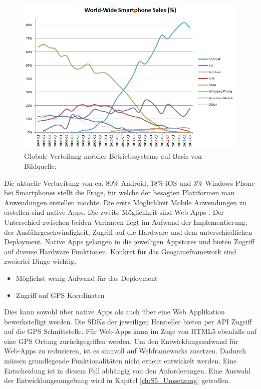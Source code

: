 \begin{figure}[H]
\begin{center}
\includegraphics[width=140mm]{images/ch4_img02_marketshare.png}
\caption{Globale Verteilung mobiler Betriebssysteme auf Basis von \textcite{Gartner.2013} -- Bildquelle: \cite{Wikipedia.2014}}
\label{img:ch4_img02_marketshare}
\end{center}
\end{figure}

Die aktuelle Verbreitung von ca. 80\% Android, 18\% iOS und 3\% Windows Phone bei Smartphones stellt die Frage, für welche der besagten Plattformen man Anwendungen erstellen möchte.
Die erste Möglichkeit Mobile Anwendungen zu erstellen sind native Apps. Die zweite Möglichkeit sind Web-Apps \cite{Charland.2011}.
Der Unterschied zwischen beiden Varianten liegt im Aufwand der Implementierung, der Ausführgeschwindigkeit, Zugriff auf die Hardware und dem unterschiedlichen Deployment.
Native Apps gelangen in die jeweiligen Appstores und bieten Zugriff auf diverse Hardware Funktionen.
Konkret für das Geogameframework sind zweierlei Dinge wichtig.

\begin{itemize}
\item Möglichst wenig Aufwand für das Deployment
\item Zugriff auf GPS Korrdinaten
\end{itemize}

Dies kann sowohl über native  Apps als auch über eine Web Applikation bewerkstelligt werden. Die SDKs der jeweiligen Hersteller bieten per API Zugriff auf die GPS Schnittstelle. Für Web-Apps kann im Zuge von HTML5 ebenfalls auf eine GPS Ortung zurückgegriffen werden.\cite{Holdener.2011}
Um den Entwicklungsaufwand für Web-Apps zu reduzieren, ist es sinnvoll auf Webframeworks zusetzen. Dadurch müssen grundlegende Funktionalitäten nicht erneut entwickelt werden.
Eine Entscheidung ist in diesem Fall abhängig von den Anforderungen. Eine Auswahl der Entwicklungsumgebung wird in Kapitel \ref{ch:S5_Umsetzung} getroffen.

